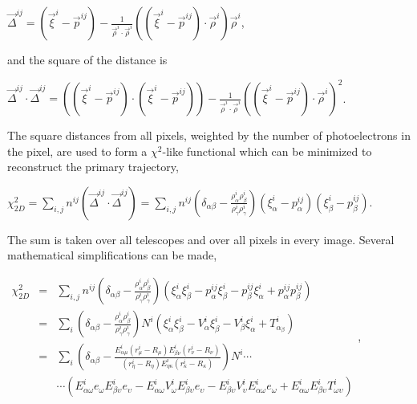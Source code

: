 \documentclass[letterpaper]{article}
\begin{document}
$\displaystyle\vec{\Delta}^{ij}
=\left(\vec{\xi}^{i}-\vec{p}^{ij}\right)-
\frac{1}{\vec{\rho}^{i}\cdot\vec{\rho}^{i}}
\left((\vec{\xi}^{i}-\vec{p}^{ij})\cdot\vec{\rho}^{i}\right)
\vec{\rho}^{i}$,

and the square of the distance is

$\displaystyle \vec{\Delta}^{ij}\cdot\vec{\Delta}^{ij}
=\left((\vec{\xi}^{i}-\vec{p}^{ij})\cdot(\vec{\xi}^{i}-\vec{p}^{ij})\right)
-\frac{1}{\vec{\rho}^{i}\cdot\vec{\rho}^{i}}
\left((\vec{\xi}^{i}-\vec{p}^{ij})\cdot\vec{\rho}^{i}\right)^{2}$.

The square distances from all pixels, weighted by the number of
photoelectrons in the pixel, 
are used to form a $\chi^{2}$-like functional which can be
minimized to reconstruct the primary trajectory,

$\displaystyle\chi_{2D}^{2}
=\sum\limits_{i,j}n^{ij}\left(\vec{\Delta}^{ij}\cdot\vec{\Delta}^{ij}\right)
=\sum\limits_{i,j}n^{ij}\left(\delta_{\alpha\beta}
-\frac{\rho_{\alpha}^{i}\rho_{\beta}^{i}}
{\rho_{\gamma}^{i}\rho_{\gamma}^{i}}\right)
\left(\xi_{\alpha}^{i}-p_{\alpha}^{ij}\right)
\left(\xi_{\beta}^{i}-p_{\beta}^{ij}\right)$.

The sum is taken over all telescopes and over all pixels in every
image. Several mathematical simplifications can be made,

$\displaystyle \begin{array}{lll}
\chi_{2D}^{2} & = & \sum\limits_{i,j}n^{ij}\left(\delta_{\alpha\beta}
-\frac{\rho_{\alpha}^{i}\rho_{\beta}^{i}}
{\rho_{\gamma}^{i}\rho_{\gamma}^{i}}\right)
\left(\xi_{\alpha}^{i}\xi_{\beta}^{i}-p_{\alpha}^{ij}\xi_{\beta}^{i}
-p_{\beta}^{ij}\xi_{\alpha}^{i}+p_{\alpha}^{ij}p_{\beta}^{ij}\right) \\
& = & \sum\limits_{i}\left(\delta_{\alpha\beta}-
\frac{\rho_{\alpha}^{i}\rho_{\beta}^{i}}
{\rho_{\gamma}^{i}\rho_{\gamma}^{i}}\right)N^{i}
\left(\xi_{\alpha}^{i}\xi_{\beta}^{i}-V_{\alpha}^{i}\xi_{\beta}^{i}-
V_{\beta}^{i}\xi_{\alpha}^{i}+T_{\alpha_{\beta}}^{i}\right) \\
& = & \sum\limits_{i}\left(\delta_{\alpha\beta}
-\frac{E_{\alpha\mu}^{i}(r_{\mu}^{i}-R_{\mu})
E_{\beta\nu}^{i}(r_{\nu}^{i}-R_{\nu})}
{(r_{\eta}^{i}-R_{\eta})E_{\eta\kappa}^{i}
(r_{\kappa}^{i}-R_{\kappa})}\right) N^{i} \cdots \\
 & & \cdots
\left(E_{\alpha\omega}^{i}e_{\omega}E_{\beta\upsilon}^{i}e_{\upsilon}
-E_{\alpha\omega}^{i}V_{\omega}^{i}E_{\beta\upsilon}^{i}e_{\upsilon}
-E_{\beta\upsilon}^{i}V_{\upsilon}^{i}E_{\alpha\omega}^{i}e_{\omega}
+E_{\alpha\omega}^{i}E_{\beta\upsilon}^{i}T_{\omega\upsilon}^{i}\right)
\end{array}$,
\end{document}
